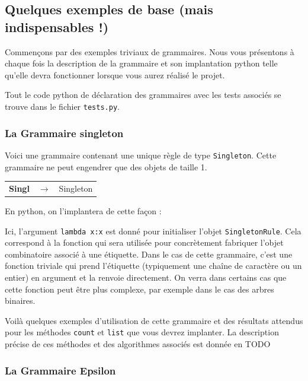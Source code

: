 \documentclass[11pt]{article}
\begin{document}
\subsection{Quelques exemples de base (mais indispensables !)}

Commençons par des exemples triviaux de grammaires. Nous vous présentons 
à chaque fois la description de la grammaire et son implantation python telle
qu'elle devra fonctionner lorsque vous aurez réalisé le projet. 

Tout le code python de déclaration des grammaires avec les tests associés se trouve
dans le fichier {\tt tests.py}.

\subsubsection{La Grammaire singleton}

Voici une grammaire contenant une unique règle de type {\tt Singleton}. Cette 
grammaire ne peut engendrer que des objets de taille 1. 

\begin{tabular}{lll}
\textbf{Singl} & $\rightarrow$ & Singleton
\end{tabular}

En python, on l'implantera de cette façon :



Ici, l'argument {\tt lambda x:x} est donné pour initialiser l'objet {\tt SingletonRule}.
Cela correspond à la fonction qui sera utilisée pour concrètement fabriquer l'objet 
combinatoire associé à une étiquette. Dans le cas de cette grammaire, c'est une fonction triviale qui prend l'étiquette
(typiquement une chaîne de caractère ou un entier) en argument et la renvoie directement. 
On verra dans certains cas que cette fonction peut être plus complexe, par exemple dans le
cas des arbres binaires.

Voilà quelques exemples d'utilisation de cette grammaire et des résultats attendus pour les méthodes 
{\tt count} et {\tt list} que vous devrez implanter. La description précise de ces méthodes et des 
algorithmes associés est donnée en TODO



\subsubsection{La Grammaire Epsilon}
\end{document}
